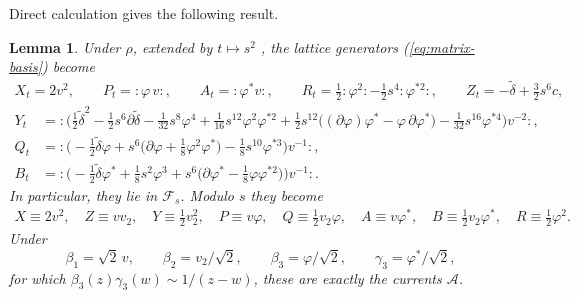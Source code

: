 \documentclass[11pt]{amsart}
\newtheorem{lemma}[theorem]{Lemma}
\theoremstyle{definition}
\theoremstyle{remark}
\begin{document}
{{Direct calculation gives the following result. 
\begin{lemma}\label{lem:lim}
	Under $\rho$, extended by $t\mapsto s^2$ \color{black}, the lattice generators (\ref{eq:matrix-basis}) become
	\begin{gather*}
		X_t=2v^2,\qquad P_t={:}\varphi\,v{:},\qquad A_t={:}\varphi^*v{:},\qquad
		R_t=\tfrac12{:}\varphi^2{:}-\tfrac12s^4{:}\varphi^{*2}{:},\qquad Z_t=-\tilde\delta+\tfrac32s^6c,
	\end{gather*}
	\vspace{-3ex}
	\begin{align*}
		Y_t&={:}\bigl(\tfrac12\tilde\delta^2-\tfrac12s^6\partial\tilde\delta-\tfrac1{32}s^8\varphi^4
		+\tfrac1{16}s^{12}\varphi^2\varphi^{*2}
		+\tfrac12s^{12}\bigl((\partial\varphi)\varphi^*-\varphi\,\partial\varphi^*\bigr)
		-\tfrac1{32}s^{16}\varphi^{*4}\bigr)v^{-2}{:},\\
		Q_t&={:}\bigl(-\tfrac12\tilde\delta\varphi+s^6\bigl(\partial\varphi+\tfrac18\varphi^2\varphi^*\bigr)
		-\tfrac18s^{10}\varphi^{*3}\bigr)v^{-1}{:},\\
		B_t&={:}\bigl(-\tfrac12\tilde\delta\varphi^*+\tfrac18s^2\varphi^3
		+s^6\bigl(\partial\varphi^*-\tfrac18\varphi\varphi^{*2}\bigr)\bigr)v^{-1}{:}.
	\end{align*}
	In particular, they lie in $\mathcal{F}_s$. Modulo $s$ they become
	\begin{align}\label{items:8generatorof A}
	X\equiv2v^2,\quad Z\equiv vv_2,\quad Y\equiv\tfrac12v_2^2,\quad P\equiv v\varphi,\quad
	Q\equiv\tfrac12v_2\varphi,\quad A\equiv v\varphi^*,\quad B\equiv\tfrac12v_2\varphi^*,\quad
	R\equiv\tfrac12\varphi^2 .
	\end{align}
	Under
	\[
	\beta_1=\sqrt2\,v,\qquad\beta_2=v_2/\sqrt2,\qquad\beta_3=\varphi/\sqrt2,\qquad
	\gamma_3=\varphi^*/\sqrt2,
	\]
	for which $\beta_3(z)\gamma_3(w)\sim1/(z-w)$, these are exactly the currents $\mathcal{A}$.
\end{lemma}
\color{blue}}}
\end{document}
